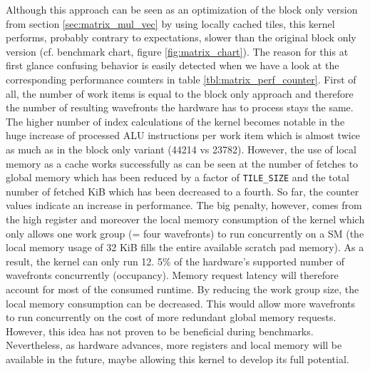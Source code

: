 Although this approach can be seen as an optimization of the block only version from section \ref{sec:matrix_mul_vec} by using locally cached tiles, this kernel performs, probably contrary to expectations, slower than the original block only version (cf. benchmark chart, figure \ref{fig:matrix_chart}). The reason for this at first glance confusing behavior is easily detected when we have a look at the corresponding performance counters in table \ref{tbl:matrix_perf_counter}.
First of all, the number of work items is equal to the block only approach and therefore the number of resulting wavefronts the hardware has to process stays the same. The higher number of index calculations of the kernel becomes notable in the huge increase of processed ALU instructions per work item which is almost twice as much as in the block only variant (44214 vs 23782). However, the use of local memory as a cache works successfully as can be seen at the number of fetches to global memory which has been reduced by a factor of \lstinline!TILE_SIZE! and the total number of fetched KiB which has been decreased to a fourth. So far, the counter values indicate an increase in performance. The big penalty, however, comes from the high register and moreover the local memory consumption of the kernel which only allows one work group (= four wavefronts) to run concurrently on a SM (the local memory usage of 32 KiB fills the entire available scratch pad memory). As a result, the kernel can only run 12. 5\% of the hardware's supported number of wavefronts concurrently (occupancy). Memory request latency will therefore account for most of the consumed runtime. By reducing the work group size, the local memory consumption can be decreased. This would allow more wavefronts to run concurrently on the cost of more redundant global memory requests. However, this idea has not proven to be beneficial during benchmarks. Nevertheless, as hardware advances, more registers and local memory will be available in the future, maybe allowing this kernel to develop its full potential. 

